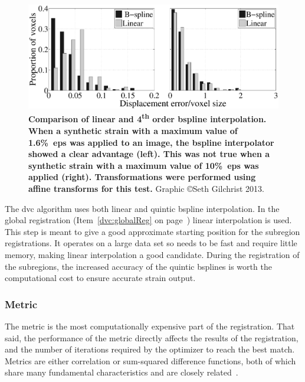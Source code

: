 \begin{figure}
\centering
\includegraphics[width=\linewidth]{./appendixDvc/figures/CompareInterpolator}
\caption[Interpolator comparison]{\textbf{Comparison of linear and 4\textsuperscript{th} order \acs*{bspline} interpolation. When a synthetic strain with a maximum value of 1.6\%~\acs*{eps} was applied to an image, the \acs*{bspline} interpolator showed a clear advantage (left). This was not true when a synthetic strain with a maximum value of 10\%~\acs*{eps} was applied (right). Transformations were performed using affine transforms for this test.} Graphic \copyright Seth Gilchrist 2013.}
\label{fig:CompareInterpolator}
\end{figure}

The \ac{dvc} algorithm uses both linear and quintic \ac{bspline} interpolation.
In the global registration (Item~\ref{dvc:globalReg} on page~\pageref{dvc:globalReg}) linear interpolation is used.
This step is meant to give a good approximate starting position for the subregion registrations.
It operates on a large data set so needs to be fast and require little memory, making linear interpolation a good candidate.
During the registration of the subregions, the increased accuracy of the quintic \acp{bspline} is worth the computational cost to ensure accurate strain output.

\subsubsection{Metric}
\label{sec:dvc_implement_register_metric}
The metric is the most computationally expensive part of the registration.
That said, the performance of the metric directly affects the results of the registration, and the number of iterations required by the optimizer to reach the best match.
Metrics are either correlation or sum-squared difference functions, both of which share many fundamental characteristics and are closely related~\citep{tong_evaluation_2005}.

